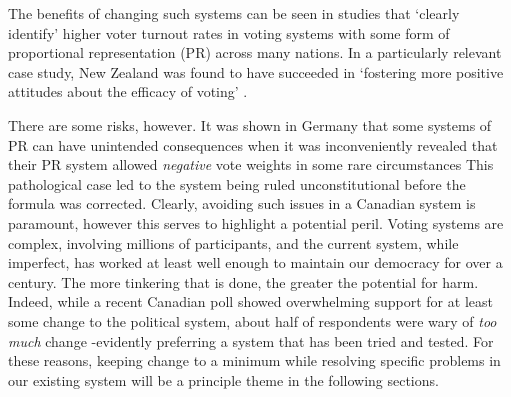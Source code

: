 \documentclass[DIV=calc, paper=a4, fontsize=11pt, twocolumn]{scrartcl}	 %
\begin{document}


The benefits of changing such systems can be seen in studies that `clearly identify' higher voter turnout rates in voting systems with some form of proportional representation (PR) \cite{Blais}
 across many nations. In a particularly relevant case study, New Zealand was found to have succeeded in `fostering more positive attitudes about the efficacy of voting' \cite{NZ_PR_results}.

There are some risks, however. It was shown in Germany that some systems of PR can have unintended consequences when it was inconveniently revealed that their PR system allowed \emph{negative} vote weights in some rare circumstances\cite{Die_Zeit_negative_vote} 
This pathological case led to the system being ruled unconstitutional before the formula was corrected. 
Clearly, avoiding such issues in a Canadian system is paramount, however this serves to highlight a potential peril.
Voting systems are complex, involving millions of participants, and the current system, while imperfect, has worked at least well enough to maintain our democracy for over a century. 
The more tinkering that is done, the greater the potential for harm. 
Indeed, while a recent Canadian poll\cite{Broadbent_poll} showed overwhelming support for at least some change to the political system, about half of respondents were wary of \emph{too much} change \--evidently preferring a system that has been tried and tested. 
For these reasons, keeping change to a minimum while resolving specific problems in our existing system will be a principle theme in the following sections.
\end{document}
